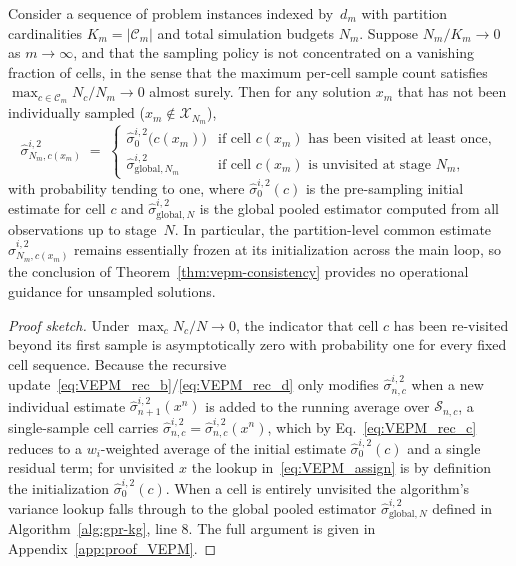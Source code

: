 \begin{corollary}
  \label{cor:partition-saturation}
  Consider a sequence of problem instances indexed by~$d_{m}$ with
  partition cardinalities $K_{m}=|\mathcal{C}_{m}|$ and total simulation
  budgets $N_{m}$.  Suppose
  \(N_{m}/K_{m}\to 0\) as $m\to\infty$, and that the sampling policy is
  not concentrated on a vanishing fraction of cells, in the sense that
  the maximum per-cell sample count satisfies
  \(\max_{c\in\mathcal{C}_{m}} N_{c}/N_{m}\to 0\) almost surely.
  Then for any solution $x_m$ that has not been individually sampled
  ($x_m\notin \mathcal{X}_{N_m}$),
  \[
    \hat{\sigma}_{N_{m},c(x_m)}^{i,2}
    \;=\;
    \begin{cases}
      \hat{\sigma}_{0}^{i,2}\!\bigl(c(x_m)\bigr) &
        \text{if cell $c(x_m)$ has been visited at least once},\\[4pt]
      \hat{\sigma}_{\mathrm{global},N_{m}}^{i,2} &
        \text{if cell $c(x_m)$ is unvisited at stage~$N_{m}$,}
    \end{cases}
  \]
  with probability tending to one, where
  $\hat{\sigma}_{0}^{i,2}(c)$ is the pre-sampling
  initial estimate for cell $c$ and $\hat{\sigma}_{\mathrm{global},N}^{i,2}$
  is the global pooled estimator computed from all observations up to
  stage~$N$.
  In particular, the partition-level common estimate
  $\hat{\sigma}_{N_{m},c(x_m)}^{i,2}$ remains essentially frozen at its
  initialization across the main loop, so the conclusion of
  Theorem~\ref{thm:vepm-consistency} provides no operational guidance for
  unsampled solutions.
\end{corollary}

\begin{proof}[Proof sketch]
  Under $\max_{c} N_{c}/N\to 0$, the indicator that cell $c$ has been
  re-visited beyond its first sample is asymptotically zero with
  probability one for every fixed cell sequence.  Because the recursive
  update~\eqref{eq:VEPM_rec_b}/\eqref{eq:VEPM_rec_d} only modifies
  $\hat{\sigma}^{i,2}_{n,c}$ when a new individual estimate
  $\hat{\sigma}^{i,2}_{n+1}(x^n)$ is added to the running average over
  $\mathcal{S}_{n,c}$, a single-sample cell carries
  $\hat{\sigma}^{i,2}_{n,c}=\hat{\sigma}^{i,2}_{n,c}(x^n)$, which by
  Eq.~\eqref{eq:VEPM_rec_c} reduces to a $w_{i}$-weighted average of the
  initial estimate $\hat{\sigma}^{i,2}_{0}(c)$ and a single residual term;
  for unvisited $x$ the lookup
  in~\eqref{eq:VEPM_assign} is by definition the initialization
  $\hat{\sigma}^{i,2}_{0}(c)$.  When a cell is entirely unvisited the
  algorithm's variance lookup falls through to the global pooled
  estimator $\hat{\sigma}_{\mathrm{global},N}^{i,2}$ defined in
  Algorithm~\ref{alg:gpr-kg}, line 8.  The full argument is given in
  Appendix~\ref{app:proof_VEPM}.
\end{proof}

